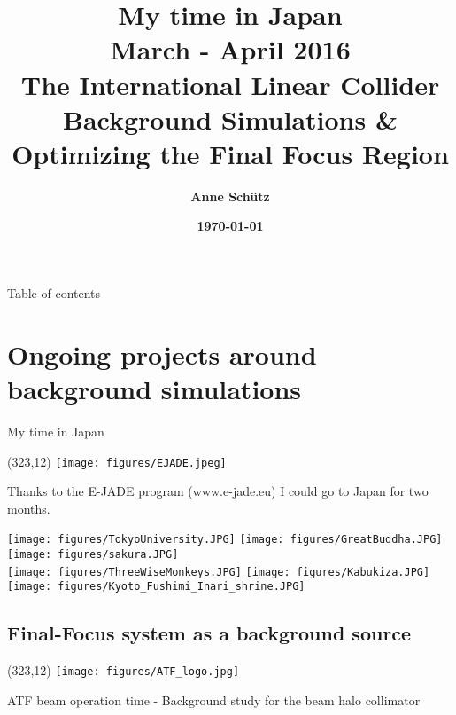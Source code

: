 \documentclass[xcolor={dvipsnames}]{beamer}
\title[ILC \& Background Simulations]{\textbf{\LARGE\alert{My time in Japan\\\normalsize March - April 2016}\\\vspace*{0.2cm} \small The International Linear Collider \\  Background Simulations \& Optimizing the Final Focus Region}}
\author{\textbf{Anne Sch\"utz}}
\institute{\textbf{KIT, DESY}}
\date{\textbf{\today}}
\newcommand{\ejadelogo}{
  \setlength{\TPHorizModule}{1pt}
  \setlength{\TPVertModule}{1pt}
  \begin{textblock}{1}(323,12)
   \texttt{[image: figures/EJADE.jpeg]}
  \end{textblock}
}
\newcommand{\ATFlogo}{
  \setlength{\TPHorizModule}{1pt}
  \setlength{\TPVertModule}{1pt}
  \begin{textblock}{1}(323,12)
   \texttt{[image: figures/ATF\_logo.jpg]}
  \end{textblock}
}
\begin{document}
{
\begin{frame}
  \titlepage
\end{frame}
}

\begin{frame}{Table of contents}
  \tableofcontents
\end{frame}


\section{Ongoing projects around background simulations}

\begin{frame}{My time in Japan}
\ejadelogo
Thanks to the E-JADE program {\tiny(www.e-jade.eu)} I could go to Japan for two months.\\
\begin{center}
 \texttt{[image: figures/TokyoUniversity.JPG]}
\hspace*{0.3cm}
\texttt{[image: figures/GreatBuddha.JPG]}
\hspace*{0.3cm}
\texttt{[image: figures/sakura.JPG]}\\
\texttt{[image: figures/ThreeWiseMonkeys.JPG]}
\hspace*{0.1cm}
\texttt{[image: figures/Kabukiza.JPG]}
\hspace*{0.1cm}
\texttt{[image: figures/Kyoto\_Fushimi\_Inari\_shrine.JPG]}
\end{center}
\end{frame}



\subsection{Final-Focus system as a background source}
\begin{frame}
\ATFlogo
 \begin{center}
    \LARGE ATF beam operation time - Background study for the beam halo collimator
 \end{center}
\end{frame}
\end{document}
